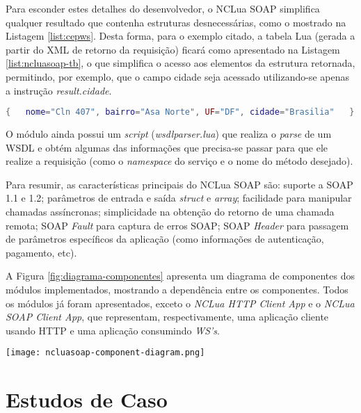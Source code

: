 Para esconder estes detalhes do desenvolvedor, o NCLua SOAP simplifica qualquer
resultado que contenha estruturas desnecessárias, como o mostrado na Listagem \ref{list:cepws}.
Desta forma, para o exemplo citado, a tabela Lua (gerada a partir do XML de retorno da requisição) 
ficará como apresentado na Listagem \ref{list:ncluasoap-tb}, o que simplifica
o acesso aos elementos da estrutura retornada, permitindo, por exemplo, que o campo
cidade seja acessado utilizando-se apenas a instrução \textit{result.cidade}.

\begin{lstlisting}[caption=Simplificação de retorno de uma requisição SOAP feita pelo NCLua SOAP, label=list:ncluasoap-tb, language=lua]
{   nome="Cln 407", bairro="Asa Norte", UF="DF", cidade="Brasilia"   }
\end{lstlisting}

O módulo ainda possui um \textit{script} (\textit{wsdlparser.lua}) que realiza
o \textit{parse} de um WSDL e obtém algumas das informações que precisa-se
passar para que ele realize a requisição 
(como o \textit{namespace} do serviço e o nome do método desejado).

Para resumir, as características principais do NCLua SOAP são: suporte a SOAP 1.1 e 1.2;
parâmetros de entrada e saída \textit{struct} e \textit{array}; 
facilidade para manipular chamadas assíncronas;
simplicidade na obtenção do retorno de uma chamada remota;
SOAP \textit{Fault} para captura de erros SOAP;
SOAP \textit{Header}\cite{soap-spec} para passagem de parâmetros específicos da aplicação 
(como informações de autenticação, pagamento, etc).

A Figura \ref{fig:diagrama-componentes} apresenta um diagrama de componentes dos módulos implementados,
mostrando a dependência entre os componentes. Todos os módulos já foram
apresentados, exceto o \textit{NCLua HTTP Client App} e o \textit{NCLua SOAP Client App},
que representam, respectivamente, uma aplicação cliente usando HTTP e
uma aplicação consumindo \textit{WS's}.

\begin{center}
	\texttt{[image: ncluasoap-component-diagram.png]}
	\label{fig:diagrama-componentes}
\end{center}

\section{Estudos de Caso} \label{sec:use-case}

